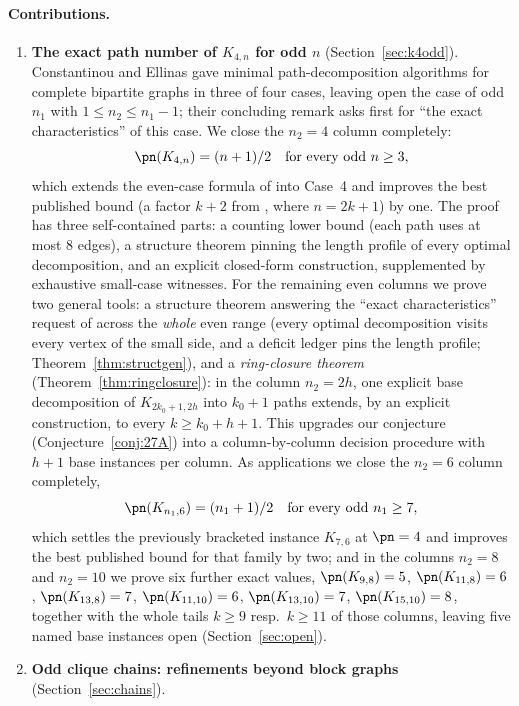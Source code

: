 \paragraph{Contributions.}
\begin{enumerate}[label=(\roman*),leftmargin=2em]
\item \textbf{The exact path number of $K_{4,n}$ for odd $n$} (Section~\ref{sec:k4odd}).
Constantinou and Ellinas \cite{CE18} gave minimal path-decomposition algorithms for complete
bipartite graphs in three of four cases, leaving open the case of odd $n_1$ with
$1\le n_2\le n_1-1$; their concluding remark asks first for ``the exact characteristics'' of
this case. We close the $n_2=4$ column completely:
\[
\pn(K_{4,n})=(n+1)/2 \quad\text{for every odd } n\ge 3,
\]
which extends the even-case formula of \cite{CE18} into Case~4 and improves the best published
bound (a factor $k+2$ from \cite{Pyb96,Fan05,LY24}, where $n=2k+1$) by one. The proof has three
self-contained parts: a counting lower bound (each path uses at most $8$ edges), a structure
theorem pinning the length profile of every optimal decomposition, and an explicit closed-form
construction, supplemented by exhaustive small-case witnesses. For the remaining even columns
we prove two general tools: a structure theorem answering the ``exact characteristics'' request
of \cite{CE18} across the \emph{whole} even range (every optimal decomposition visits every
vertex of the small side, and a deficit ledger pins the length profile;
Theorem~\ref{thm:structgen}), and a \emph{ring-closure theorem}
(Theorem~\ref{thm:ringclosure}): in the column $n_2=2h$, one explicit base decomposition of
$K_{2k_0+1,2h}$ into $k_0+1$ paths extends, by an explicit construction, to every
$k\ge k_0+h+1$. This upgrades our conjecture (Conjecture~\ref{conj:27A}) into a
column-by-column decision procedure with $h+1$ base instances per column. As applications we
close the $n_2=6$ column completely,
\[
\pn(K_{n_1,6})=(n_1+1)/2 \quad\text{for every odd } n_1\ge 7,
\]
which settles the previously bracketed instance $K_{7,6}$ at $\pn=4$ and improves the best
published bound for that family by two; and in the columns $n_2=8$ and $n_2=10$ we prove six
further exact values, $\pn(K_{9,8})=5$, $\pn(K_{11,8})=6$, $\pn(K_{13,8})=7$,
$\pn(K_{11,10})=6$, $\pn(K_{13,10})=7$, $\pn(K_{15,10})=8$, together with the whole tails
$k\ge9$ resp.\ $k\ge11$ of those columns, leaving five named base instances open
(Section~\ref{sec:open}).
\item \textbf{Odd clique chains: refinements beyond block graphs} (Section~\ref{sec:chains}).

\end{enumerate}
